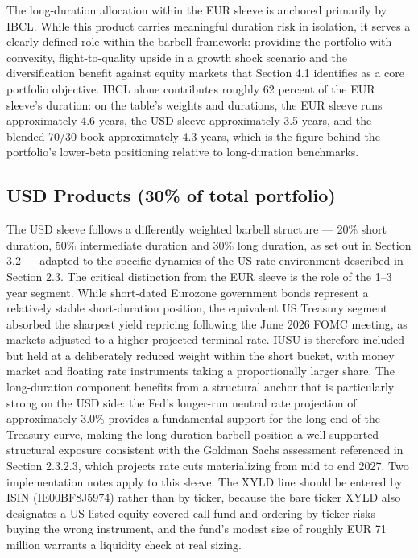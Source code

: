 \documentclass[11pt,a4paper]{article}
\begin{document}
The long-duration allocation within the EUR sleeve is anchored primarily by IBCL. While this product carries meaningful duration risk in isolation, it serves a clearly defined role within the barbell framework: providing the portfolio with convexity, flight-to-quality upside in a growth shock scenario and the diversification benefit against equity markets that Section 4.1 identifies as a core portfolio objective. IBCL alone contributes roughly 62 percent of the EUR sleeve's duration: on the table's weights and durations, the EUR sleeve runs approximately 4.6 years, the USD sleeve approximately 3.5 years, and the blended 70/30 book approximately 4.3 years, which is the figure behind the portfolio's lower-beta positioning relative to long-duration benchmarks.

\subsection{USD Products (30\% of total portfolio)}

The USD sleeve follows a differently weighted barbell structure --- 20\% short duration, 50\% intermediate duration and 30\% long duration, as set out in Section 3.2 --- adapted to the specific dynamics of the US rate environment described in Section 2.3. The critical distinction from the EUR sleeve is the role of the 1--3 year segment. While short-dated Eurozone government bonds represent a relatively stable short-duration position, the equivalent US Treasury segment absorbed the sharpest yield repricing following the June 2026 FOMC meeting, as markets adjusted to a higher projected terminal rate. IUSU is therefore included but held at a deliberately reduced weight within the short bucket, with money market and floating rate instruments taking a proportionally larger share. The long-duration component benefits from a structural anchor that is particularly strong on the USD side: the Fed's longer-run neutral rate projection of approximately 3.0\% provides a fundamental support for the long end of the Treasury curve, making the long-duration barbell position a well-supported structural exposure consistent with the Goldman Sachs assessment referenced in Section 2.3.2.3, which projects rate cuts materializing from mid to end 2027. Two implementation notes apply to this sleeve. The XYLD line should be entered by ISIN (IE00BF8J5974) rather than by ticker, because the bare ticker XYLD also designates a US-listed equity covered-call fund and ordering by ticker risks buying the wrong instrument, and the fund's modest size of roughly EUR 71 million warrants a liquidity check at real sizing.
\end{document}
